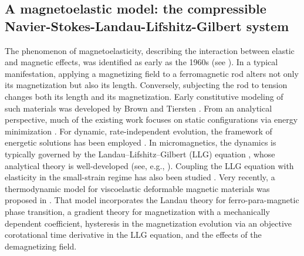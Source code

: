 \documentclass[reqno,11pt]{amsart}
\numberwithin{equation}{section}
\begin{document}

\subsection{A magnetoelastic model: the compressible Navier-Stokes-Landau-Lifshitz-Gilbert system}

The phenomenon of magnetoelasticity, describing the interaction between elastic and magnetic effects, was identified as early as the 1960s (see \cite{ref3}). In a typical manifestation, applying a magnetizing field to a ferromagnetic rod alters not only its magnetization but also its length. Conversely, subjecting the rod to tension changes both its length and its magnetization. Early constitutive modeling of such materials was developed by Brown \cite{ref3} and Tiersten \cite{ref31,ref32}. From an analytical perspective, much of the existing work focuses on static configurations via energy minimization \cite{ref7,ref8,ref14}. For dynamic, rate-independent evolution, the framework of energetic solutions has been employed \cite{ref17,ref26}. In micromagnetics, the dynamics is typically governed by the Landau--Lifshitz--Gilbert (LLG) equation \cite{ref12,ref13,ref18}, whose analytical theory is well-developed (see, e.g., \cite{ref1,ref5,ref24,ref25}). Coupling the LLG equation with elasticity in the small-strain regime has also been studied \cite{ref4,ref6}. Very recently, a thermodynamic model for viscoelastic deformable magnetic materials was proposed in \cite{ref34}. That model incorporates the Landau theory for ferro-para-magnetic phase transition, a gradient theory for magnetization with a mechanically dependent coefficient, hysteresis in the magnetization evolution via an objective corotational time derivative in the LLG equation, and the effects of the demagnetizing field.
\end{document}
